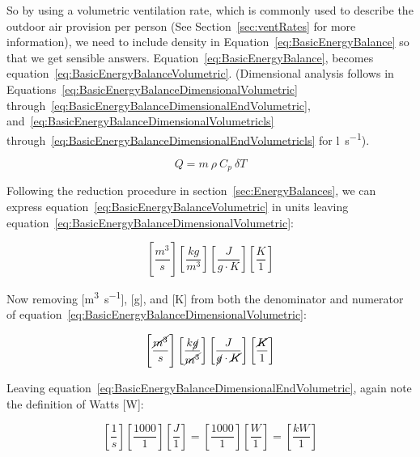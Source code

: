 So by using a volumetric ventilation rate, which is commonly used to describe the outdoor air provision per person (See Section~\ref{sec:ventRates} for more information), we need to include density in Equation~\ref{eq:BasicEnergyBalance} so that we get sensible answers.  Equation~\ref{eq:BasicEnergyBalance}, becomes equation~\ref{eq:BasicEnergyBalanceVolumetric}.  (Dimensional analysis follows in Equations~\ref{eq:BasicEnergyBalanceDimensionalVolumetric} through~\ref{eq:BasicEnergyBalanceDimensionalEndVolumetric}, and~\ref{eq:BasicEnergyBalanceDimensionalVolumetricls} through~\ref{eq:BasicEnergyBalanceDimensionalEndVolumetricls} for \si{\litre\per\second}).

\begin{equation}\label{eq:BasicEnergyBalanceVolumetric}
Q = m~\rho~C_p~\delta T
\end{equation}

Following the reduction procedure in section~\ref{sec:EnergyBalances}, we can express equation~\ref{eq:BasicEnergyBalanceVolumetric} in units leaving equation~\ref{eq:BasicEnergyBalanceDimensionalVolumetric}:

\begin{equation}\label{eq:BasicEnergyBalanceDimensionalVolumetric}
\left[ \frac{m^3}{s} \right] \left[ \frac{kg}{m^3} \right] \left[ \frac{J}{g\cdot K} \right] \left[ \frac{K}{1} \right]
\end{equation}

Now removing [\si{\cubic\metre\per\second}], [g], and [K] from both the denominator and numerator of equation~\ref{eq:BasicEnergyBalanceDimensionalVolumetric}:

\begin{equation}
\left[ \frac{\cancel{m^3}}{s} \right] \left[ \frac{k\cancel{g}}{\cancel{m^3}} \right] \left[ \frac{J}{\cancel{g} \cdot \cancel{K}} \right] \left[ \frac{\cancel{K}}{1} \right]
\end{equation}

Leaving equation~\ref{eq:BasicEnergyBalanceDimensionalEndVolumetric}, again note the definition of Watts [W]:

\begin{equation}\label{eq:BasicEnergyBalanceDimensionalEndVolumetric}
\left[ \frac{1}{s} \right] \left[ \frac{1000}{1} \right] \left[ \frac{J}{1} \right] = \left[ \frac{1000}{1} \right] \left[ \frac{W}{1} \right] = \left[ \frac{kW}{1} \right]
\end{equation}

\vspace{1cm}

